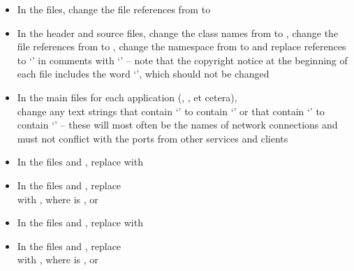 \begin{itemize}
\item In the  files, change the file references from
 to 
\item In the  header and source files, change the class names from
 to , change the file references from
 to , change the namespace from
 to  and replace references to `' in
comments with `' -- note that the copyright notice at the beginning of each
file includes the word `', which should not be changed
\item In the main files for each application (,
, et cetera),\\
change any text strings that contain `' to contain `' or that
contain `' to contain `' -- these will most often be the
names of \yarp{} network connections and must not conflict with the ports from other
services and clients
\item In the files  and , replace
 with
\item In the files  and
, replace\\
 with
,
where  is ,  or 
\item In the files  and , replace
with 
\item In the files  and ,
replace\\
with ,
where  is ,  or 

\end{itemize}
